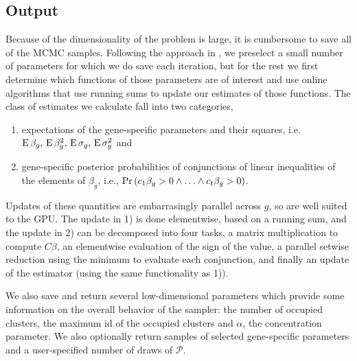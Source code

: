 {%


\subsection{Output}
\label{subsec:output}
Because of the dimensionality of the problem is large, it is cumbersome to save all of the MCMC samples. Following the approach in \citet{landau}, we preselect a small number of parameters for which we do save each iteration, but for the rest we first determine which functions of those parameters are of interest and use online algorithms that use running sums to update our estimates of those functions. The class of estimates we calculate fall into two categories,
\begin{enumerate}
\item expectations of the gene-specific parameters and their squares, i.e. $\operatorname{E} \beta_g,\, \operatorname{E} \beta_g^2,\, \operatorname{E}\sigma_g,\, \operatorname{E}\sigma_g^2$ and 
\item gene-specific posterior probabilities of conjunctions of linear
  inequalities of the elements of $\beta_g$, i.e.,
  $\operatorname{Pr}\left(c_1\beta_g > 0 \land \ldots \land c_t\beta_g > 0\right)$.
\end{enumerate}
Updates of these quantities are embarrasingly parallel across $g$, so are well suited to the GPU. The update in 1) is done elementwise, based on a running sum, and the update in 2) can be decomposed into four tasks, a matrix multiplication to compute $C\beta$, an elementwise evaluation of the sign of the value, a parallel setwise reduction using the minimum to evaluate each conjunction, and finally an update of the estimator (using the same functionality as 1)).

We also save and return several low-dimensional parameters which provide some information on the overall behavior of the sampler: the number of occupied clusters, the maximum id of the occupied clusters and $\alpha$, the concentration parameter. We also optionally return samples of selected gene-specific parameters and a user-specified number of draws of $\mathcal{P}$.


}
